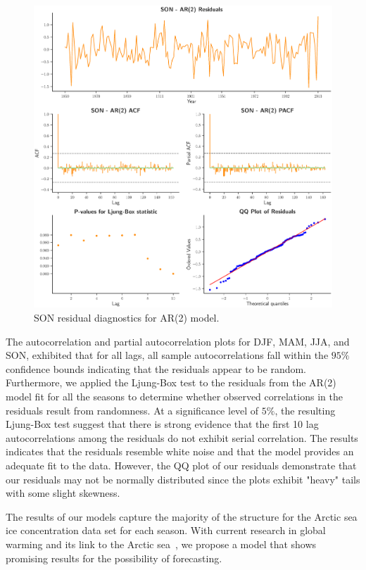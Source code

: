 \documentclass[12pt]{article}
\begin{document}
\begin{figure}[H]
  \centering
  \includegraphics[width=1\textwidth,center]{figs/son_res}
  \caption{SON residual diagnostics for AR(2) model.}\label{son_res}
\end{figure}

The autocorrelation and partial autocorrelation plots for DJF, MAM, JJA, and SON, exhibited that for all lags, all sample autocorrelations fall within the $95\%$ confidence bounds indicating that the residuals appear to be random. Furthermore, we applied the Ljung-Box test to the residuals from the AR(2) model fit for all the seasons to determine whether observed correlations in the residuals result from randomness. At a significance level of $5\%$, the resulting Ljung-Box test suggest that there is strong evidence that the first 10 lag autocorrelations among the residuals do not exhibit serial correlation. The results indicates that the residuals resemble white noise and that the model provides an adequate fit to the data. However, the QQ plot of our residuals demonstrate that our residuals may not be normally distributed since the plots exhibit "heavy" tails with some slight skewness.

The results of our models capture the majority of the structure for the Arctic sea ice concentration data set for each season. With current research in global warming and its link to the Arctic sea~\citep{pithan}, we propose a model that shows promising results for the possibility of forecasting. 
\end{document}

